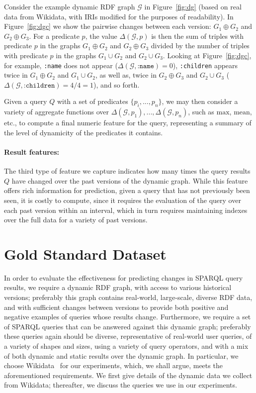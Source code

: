 \documentclass[runningheads]{llncs}
\begin{document}
\begin{example}
Consider the example dynamic RDF graph $\mathcal{G}$ in Figure~\ref{fig:dg} (based on real data from Wikidata, with IRIs modified for the purposes of readability). In Figure~\ref{fig:dgc} we show the pairwise changes between each version: $G_1 \oplus G_2$ and $G_2 \oplus G_3$. For a predicate $p$, the value $\Delta(\mathcal{G},p)$ is then the sum of triples with predicate $p$ in the graphs $G_1 \oplus G_2$ and $G_2 \oplus G_3$ divided by the number of triples with predicate $p$ in the graphs $G_1 \cup G_2$ and $G_2 \cup G_3$. Looking at Figure~\ref{fig:dgc}, for example, \texttt{:name} does not appear ($\Delta(\mathcal{G},\texttt{:name})=0$), \texttt{:children} appears twice in $G_1 \oplus G_2$ and $G_1 \cup G_2$, as well as, twice in $G_2 \oplus G_3$ and $G_2 \cup G_3$ ($\Delta(\mathcal{G},\texttt{:children})=4/4=1$), and so forth.
\end{example}

Given a query $Q$ with a set of predicates $\{ p_i, ..., p_n \}$, we may then consider a variety of aggregate functions over $\Delta(\mathcal{G},p_1), ..., \Delta(\mathcal{G},p_n)$, such as $\mathrm{max}$, $\mathrm{mean}$, etc., to compute a final numeric feature for the query, representing a summary of the level of dynamicity of the predicates it contains.

\paragraph{Result features:} The third type of feature we capture indicates how many times the query results $Q$ have changed over the past versions of the dynamic graph. While this feature offers rich information for prediction, given a query that has not previously been seen, it is costly to compute, since it requires the evaluation of the query over each past version within an interval, which in turn requires maintaining indexes over the full data for a variety of past versions.

\section{Gold Standard Dataset}
\label{sec:data}

In order to evaluate the effectiveness for predicting changes in SPARQL query results, we require a dynamic RDF graph, with access to various historical versions; preferably this graph contains real-world, large-scale, diverse RDF data, and with sufficient changes between versions to provide both positive and negative examples of queries whose results change. Furthermore, we require a set of SPARQL queries that can be answered against this dynamic graph; preferably these queries again should be diverse, representative of real-world user queries, of a variety of shapes and sizes, using a variety of query operators, and with a mix of both dynamic and static results over the dynamic graph. In particular, we choose Wikidata~\cite{VrandecicK14} for our experiments, which, we shall argue, meets the aforementioned requirements. We first give details of the dynamic data we collect from Wikidata; thereafter, we discuss the queries we use in our experiments.
\end{document}
